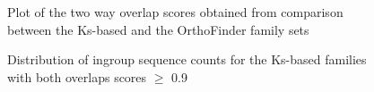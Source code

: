 \documentclass{article}
\begin{document}
		\begin{figure}[h!]
			\caption{Plot of the two way overlap scores obtained from comparison between the Ks-based and the OrthoFinder family sets}
			\label{fig:scatter_lgf5_vs_orthofinder_overlap_lgf5}
		\end{figure}
		
		\begin{figure}[h!]
			\caption{Distribution of ingroup sequence counts for the Ks-based families with both overlaps scores $\geq$ 0.9 }
			\label{fig:hist_seq_ct_lgf5_vs_orthofinder_90percent_overlap}
		\end{figure}
		
\end{document}
